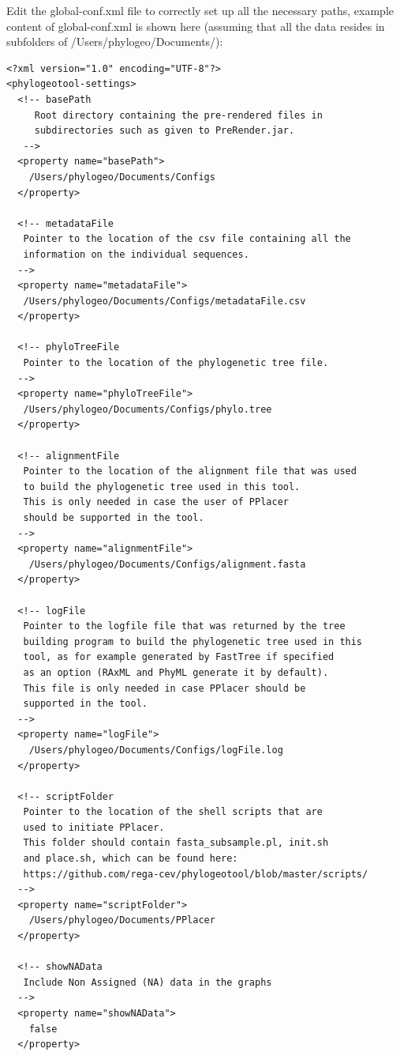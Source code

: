 \documentclass[a4paper, 11pt]{article} %
\begin{document}
Edit the global-conf.xml file to correctly set up all the necessary paths, example content of global-conf.xml is shown here (assuming that all the data resides in subfolders of /Users/phylogeo/Documents/):
\begin{verbatim}
<?xml version="1.0" encoding="UTF-8"?>
<phylogeotool-settings>
  <!-- basePath
     Root directory containing the pre-rendered files in 
     subdirectories such as given to PreRender.jar.
   -->
  <property name="basePath">
    /Users/phylogeo/Documents/Configs
  </property>

  <!-- metadataFile
   Pointer to the location of the csv file containing all the 
   information on the individual sequences.
  -->
  <property name="metadataFile">
   /Users/phylogeo/Documents/Configs/metadataFile.csv
  </property>

  <!-- phyloTreeFile
   Pointer to the location of the phylogenetic tree file.
  -->
  <property name="phyloTreeFile">
   /Users/phylogeo/Documents/Configs/phylo.tree
  </property>

  <!-- alignmentFile
   Pointer to the location of the alignment file that was used 
   to build the phylogenetic tree used in this tool.
   This is only needed in case the user of PPlacer 
   should be supported in the tool.
  -->
  <property name="alignmentFile">
    /Users/phylogeo/Documents/Configs/alignment.fasta
  </property>
  
  <!-- logFile
   Pointer to the logfile file that was returned by the tree 
   building program to build the phylogenetic tree used in this 
   tool, as for example generated by FastTree if specified 
   as an option (RAxML and PhyML generate it by default).
   This file is only needed in case PPlacer should be 
   supported in the tool.
  -->
  <property name="logFile">
    /Users/phylogeo/Documents/Configs/logFile.log
  </property>

  <!-- scriptFolder
   Pointer to the location of the shell scripts that are 
   used to initiate PPlacer.
   This folder should contain fasta_subsample.pl, init.sh 
   and place.sh, which can be found here:
   https://github.com/rega-cev/phylogeotool/blob/master/scripts/
  -->
  <property name="scriptFolder">
    /Users/phylogeo/Documents/PPlacer
  </property>

  <!-- showNAData 
   Include Non Assigned (NA) data in the graphs
  -->
  <property name="showNAData">
    false
  </property>
  

\end{verbatim}
\end{document}
